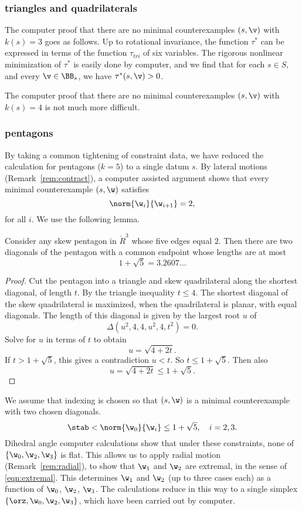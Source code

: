 \subsubsection{triangles and quadrilaterals}

The computer proof that there are no minimal counterexamples $(s,\v)$
with $k(s)=3$ goes as follows.  Up to rotational invariance, the function
$\tau^*$ can be expressed in terms of the function $\tau_{tri}$ of six
variables.  The rigorous nonlinear minimization of $\tau^*$ is easily done
by computer, and we find that for each $s\in S$, and every $\v\in \BB_s$,
we have $\tau^*(s,\v)>0$.

The computer proof that there are no minimal counterexamples $(s,\v)$
with $k(s)=4$ is not much more difficult.

\subsubsection{pentagons}

By taking a common tightening of constraint data, we have reduced the
calculation for pentagons ($k=5$) to a single datum $s$.   
By lateral motions  (Remark~\ref{rem:contract}), 
a computer assisted argument shows that every minimal
counterexample $(s,\w)$ satisfies
\[
\norm{\w_i}{\w_{i+1}} = 2,
\]
for all $i$.  We use the following lemma.

\begin{lemma}
Consider any skew pentagon in $\ring{R}^3$ whose five edges equal $2$.
Then there are two  diagonals  of the pentagon with a common
endpoint whose lengths  are at most
\[
1 + \sqrt{5} = 3.2607\ldots
\]
\end{lemma}

\begin{proof}
  Cut the pentagon into a triangle and skew quadrilateral along the
  shortest diagonal, of length $t$.  By the triangle inequality
  $t\le4$.  The shortest diagonal of the skew quadrilateral is
  maximized, when the quadrilateral is planar, with equal diagonals.
  The length of this diagonal is given by the largest root $u$ of
\[
\Delta(u^2,4,4,u^2,4,t^2)=0.
\]
Solve for $u$ in terms of $t$ to obtain
\[
u = \sqrt{4 + 2 t}.
\]
If $t>1+\sqrt{5}$, this gives a contradiction $u<t$.  
So $t\le 1+\sqrt{5}$.
Then also
\[
u = \sqrt{4 + 2t} \le 1+\sqrt{5}.
\]
\end{proof}


We assume that indexing is chosen so that $(s,\w)$ is a minimal
counterexample with two chosen diagonals.
\[
\stab < \norm{\w_0}{\w_i} \le 1+\sqrt{5},\quad i=2,3.
\]
Dihedral angle computer calculations show that under these
constraints, none of $\{\w_0,\w_2,\w_3\}$ is flat.  This allows
us to apply radial motion (Remark~\ref{rem:radial}), to show that
$\w_1$ and $\w_2$ are extremal, in the sense of \eqref{eqn:extremal}.
This determines $\w_1$ and $\w_2$ (up to three cases each) as a
function of $\w_0$, $\w_2$, $\w_3$.  The calculations reduce in this
way to a single simplex $\{\orz,\w_0,\w_2,\w_3\}$, which have been
carried out by computer.

